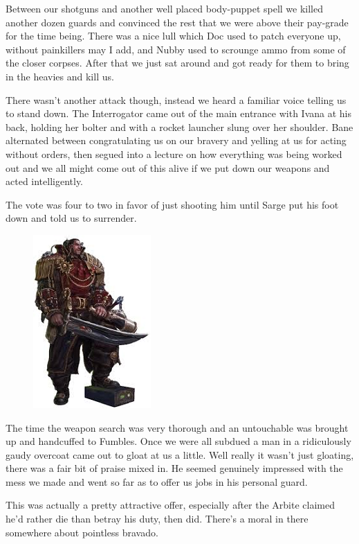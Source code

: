 Between our shotguns and another well placed body-puppet spell we killed another dozen guards and convinced the rest that we were above their pay-grade for the time being. 
There was a nice lull which Doc used to patch everyone up, without painkillers may I add, and Nubby used to scrounge ammo from some of the closer corpses. 
After that we just sat around and got ready for them to bring in the heavies and kill us.

There wasn't another attack though, instead we heard a familiar voice telling us to stand down. 
The Interrogator came out of the main entrance with Ivana at his back, holding her bolter and with a rocket launcher slung over her shoulder. 
Bane alternated between congratulating us on our bravery and yelling at us for acting without orders, then segued into a lecture on how everything was being worked out and we all might come out of this alive if we put down our weapons and acted intelligently. 


The vote was four to two in favor of just shooting him until Sarge put his foot down and told us to surrender.

\begin{figure}
	\begin{center}
		\includegraphics[width=\figwidth]{pics/9/41.png}
	\end{center}
\end{figure}
The time the weapon search was very thorough and an untouchable was brought up and handcuffed to Fumbles. 
Once we were all subdued a man in a ridiculously gaudy overcoat came out to gloat at us a little. 
Well really it wasn't just gloating, there was a fair bit of praise mixed in. 
He seemed genuinely impressed with the mess we made and went so far as to offer us jobs in his personal guard. 


This was actually a pretty attractive offer, especially after the Arbite claimed he'd rather die than betray his duty, then did. 
There's a moral in there somewhere about pointless bravado.

